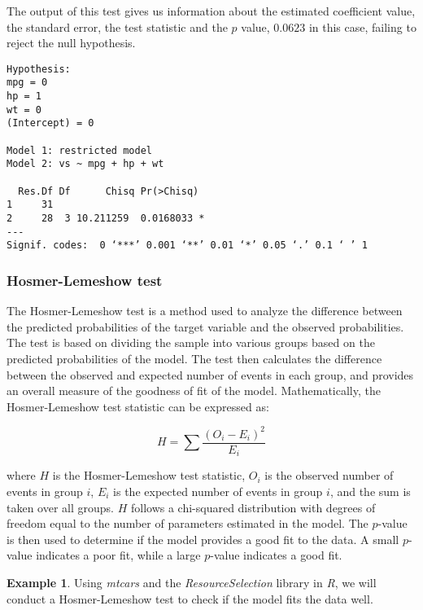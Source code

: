 \documentclass{article}[12pt]
\theoremstyle{definition}
\newtheorem{exmp}{Example}[section]
\begin{document}
\medskip

\noindent
The output of this test gives us information about the estimated coefficient value, the standard error, the test statistic and the $p$ value, $0.0623$ in this case, failing to reject the null hypothesis.

\medskip

\begin{verbatim}
Hypothesis:
mpg = 0
hp = 1
wt = 0
(Intercept) = 0

Model 1: restricted model
Model 2: vs ~ mpg + hp + wt

  Res.Df Df      Chisq Pr(>Chisq)
1     31                         
2     28  3 10.211259  0.0168033 *
---
Signif. codes:  0 ‘***’ 0.001 ‘**’ 0.01 ‘*’ 0.05 ‘.’ 0.1 ‘ ’ 1
\end{verbatim}

\newpage

\bigskip

\subsubsection{Hosmer-Lemeshow test}

\bigskip

The Hosmer-Lemeshow test is a method used to analyze the difference between the predicted probabilities of the target variable and the observed probabilities. The test is based on dividing the sample into various groups based on the predicted probabilities of the model. The test then calculates the difference between the observed and expected number of events in each group, and provides an overall measure of the goodness of fit of the model. Mathematically, the Hosmer-Lemeshow test statistic can be expressed as:

\medskip

$$H = \sum \frac{\left(O_i - E_i\right)^2}{E_i}$$

\medskip

\noindent
where $H$ is the Hosmer-Lemeshow test statistic, $O_i$ is the observed number of events in group $i$, $E_i$ is the expected number of events in group $i$, and the sum is taken over all groups. $H$ follows a chi-squared distribution with degrees of freedom equal to the number of parameters estimated in the model. The $p$-value is then used to determine if the model provides a good fit to the data. A small $p$-value indicates a poor fit, while a large $p$-value indicates a good fit.

\medskip

\begin{exmp}
    Using \emph{mtcars} and the \emph{ResourceSelection} library in \emph{R}, we will conduct a Hosmer-Lemeshow test to check if the model fits the data well.
\end{exmp}
\end{document}
